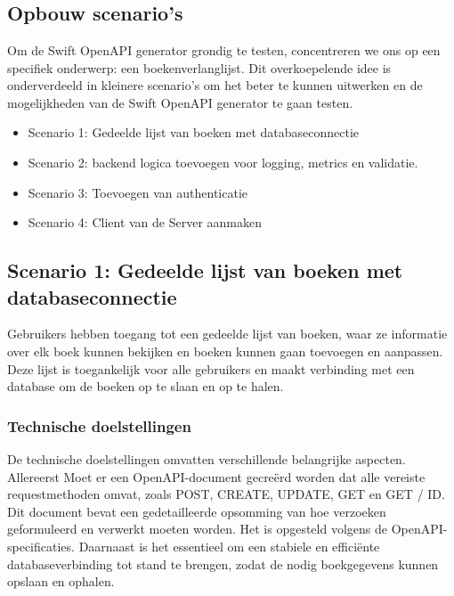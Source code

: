 
\chapter{}%

\label{ch:proof-of-concept}

\section{Opbouw scenario's}

Om de Swift OpenAPI generator grondig te testen, concentreren we ons op een specifiek onderwerp: een boekenverlanglijst. Dit overkoepelende idee is onderverdeeld in kleinere scenario’s om het beter te kunnen uitwerken en de mogelijkheden van de Swift OpenAPI generator te gaan testen. 

\begin{itemize}
  \item	Scenario 1: Gedeelde lijst van boeken met databaseconnectie
  \item	Scenario 2: backend logica toevoegen voor logging, metrics en validatie. 
  \item Scenario 3: Toevoegen van authenticatie
  \item Scenario 4: Client van de Server aanmaken
\end{itemize}

\section{Scenario 1: Gedeelde lijst van boeken met databaseconnectie}
Gebruikers hebben toegang tot een gedeelde lijst van boeken, waar ze informatie over elk boek kunnen bekijken en boeken kunnen gaan toevoegen en aanpassen. Deze lijst is toegankelijk voor alle gebruikers en maakt verbinding met een database om de boeken op te slaan en op te halen. 

\subsection{Technische doelstellingen}
De technische doelstellingen omvatten verschillende belangrijke aspecten. Allereerst Moet er een OpenAPI-document gecreërd worden dat alle vereiste requestmethoden omvat, zoals POST, CREATE, UPDATE, GET en GET / ID.  Dit document bevat een gedetailleerde opsomming van hoe verzoeken geformuleerd en verwerkt moeten worden. Het is opgesteld volgens de OpenAPI-specificaties. Daarnaast is het essentieel om een stabiele en efficiënte databaseverbinding tot stand te brengen, zodat de nodig boekgegevens kunnen opslaan en ophalen. 

